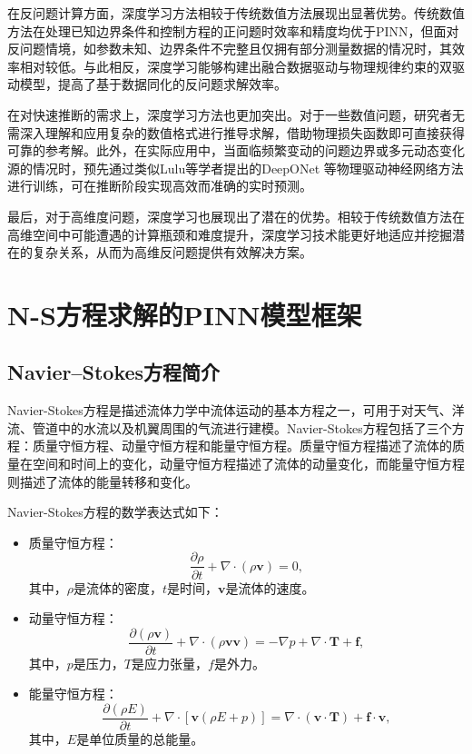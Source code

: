 在反问题计算方面，深度学习方法相较于传统数值方法展现出显著优势。传统数值方法在处理已知边界条件和控制方程的正问题时效率和精度均优于PINN，但面对反问题情境，如参数未知、边界条件不完整且仅拥有部分测量数据的情况时，其效率相对较低。与此相反，深度学习能够构建出融合数据驱动与物理规律约束的双驱动模型，提高了基于数据同化的反问题求解效率。

在对快速推断的需求上，深度学习方法也更加突出。对于一些数值问题，研究者无需深入理解和应用复杂的数值格式进行推导求解，借助物理损失函数即可直接获得可靠的参考解。此外，在实际应用中，当面临频繁变动的问题边界或多元动态变化源的情况时，预先通过类似Lulu等学者提出的DeepONet \cite{lu2021learning}等物理驱动神经网络方法进行训练，可在推断阶段实现高效而准确的实时预测。

最后，对于高维度问题，深度学习也展现出了潜在的优势。相较于传统数值方法在高维空间中可能遭遇的计算瓶颈和难度提升，深度学习技术能更好地适应并挖掘潜在的复杂关系，从而为高维反问题提供有效解决方案。

\section{N-S方程求解的PINN模型框架}

\subsection{Navier–Stokes方程简介}

Navier-Stokes方程是描述流体力学中流体运动的基本方程之一，可用于对天气、洋流、管道中的水流以及机翼周围的气流进行建模。Navier-Stokes方程包括了三个方程：质量守恒方程、动量守恒方程和能量守恒方程。质量守恒方程描述了流体的质量在空间和时间上的变化，动量守恒方程描述了流体的动量变化，而能量守恒方程则描述了流体的能量转移和变化。

Navier-Stokes方程的数学表达式如下：
\begin{itemize}
    \item 质量守恒方程：
    \begin{equation}\frac{\partial\rho}{\partial t}+\nabla\cdot(\rho\mathbf{v})=0,\end{equation}
    其中，$\rho $是流体的密度，$t$是时间，$\mathbf{v}$是流体的速度。
    \item 动量守恒方程：
    \begin{equation}\frac{\partial(\rho\mathbf{v})}{\partial t}+\nabla\cdot(\rho\mathbf{v}\mathbf{v})=-\nabla p+\nabla\cdot\mathbf{T}+\mathbf{f},\end{equation}
    其中，$p$是压力，$T$是应力张量，$f$是外力。
    \item 能量守恒方程：
    \begin{equation}\frac{\partial(\rho E)}{\partial t}+\nabla\cdot[\mathbf{v}(\rho E+p)]=\nabla\cdot(\mathbf{v}\cdot\mathbf{T})+\mathbf{f}\cdot\mathbf{v},\end{equation}
    其中，$E$是单位质量的总能量。
\end{itemize}

